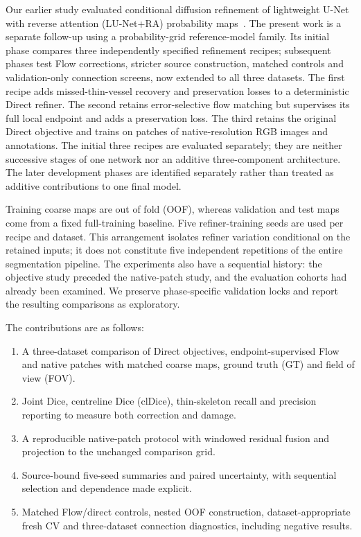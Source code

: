 \documentclass[jimaging,article,submit,pdftex,moreauthors]{Definitions/mdpi}
\begin{document}
Our earlier study evaluated conditional diffusion refinement of lightweight U-Net with reverse attention (LU-Net+RA) probability maps~\cite{Bayanian2026}. The present work is a separate follow-up using a probability-grid reference-model family. Its initial phase compares three independently specified refinement recipes; subsequent phases test Flow corrections, stricter source construction, matched controls and validation-only connection screens, now extended to all three datasets. The first recipe adds missed-thin-vessel recovery and preservation losses to a deterministic Direct refiner. The second retains error-selective flow matching but supervises its full local endpoint and adds a preservation loss. The third retains the original Direct objective and trains on patches of native-resolution RGB images and annotations. The initial three recipes are evaluated separately; they are neither successive stages of one network nor an additive three-component architecture. The later development phases are identified separately rather than treated as additive contributions to one final model.

Training coarse maps are out of fold (OOF), whereas validation and test maps come from a fixed full-training baseline. Five refiner-training seeds are used per recipe and dataset. This arrangement isolates refiner variation conditional on the retained inputs; it does not constitute five independent repetitions of the entire segmentation pipeline. The experiments also have a sequential history: the objective study preceded the native-patch study, and the evaluation cohorts had already been examined. We preserve phase-specific validation locks and report the resulting comparisons as exploratory.

The contributions are as follows:
\begin{enumerate}[itemsep=0pt,parsep=0pt,topsep=3pt]
\item A three-dataset comparison of Direct objectives, endpoint-supervised Flow and native patches with matched coarse maps, ground truth (GT) and field of view (FOV).
\item Joint Dice, centreline Dice (clDice), thin-skeleton recall and precision reporting to measure both correction and damage.
\item A reproducible native-patch protocol with windowed residual fusion and projection to the unchanged comparison grid.
\item Source-bound five-seed summaries and paired uncertainty, with sequential selection and dependence made explicit.
\item Matched Flow/direct controls, nested OOF construction, dataset-appropriate fresh CV and three-dataset connection diagnostics, including negative results.
\end{enumerate}
\end{document}
